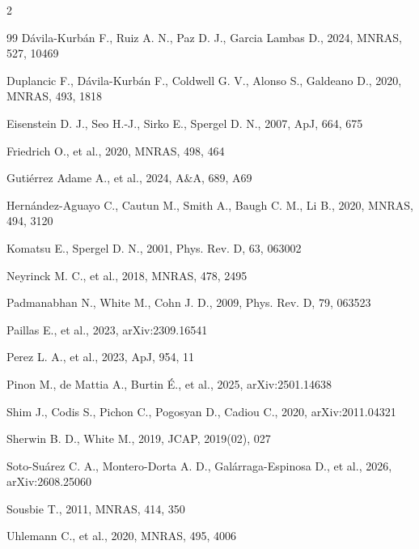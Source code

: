 \documentclass[11pt,a4paper]{article}
\begin{document}
\begin{multicols}{2}
\begin{thebibliography}{99}
D\'avila-Kurb\'an F., Ruiz A. N., Paz D. J., Garcia Lambas D., 2024, MNRAS, 527, 10469

Duplancic F., D\'avila-Kurb\'an F., Coldwell G. V., Alonso S., Galdeano D., 2020, MNRAS, 493, 1818

Eisenstein D. J., Seo H.-J., Sirko E., Spergel D. N., 2007, ApJ, 664, 675

Friedrich O., et al., 2020, MNRAS, 498, 464

Guti\'errez Adame A., et al., 2024, A\&A, 689, A69

Hern\'andez-Aguayo C., Cautun M., Smith A., Baugh C. M., Li B., 2020, MNRAS, 494, 3120

Komatsu E., Spergel D. N., 2001, Phys. Rev. D, 63, 063002

Neyrinck M. C., et al., 2018, MNRAS, 478, 2495

Padmanabhan N., White M., Cohn J. D., 2009, Phys. Rev. D, 79, 063523

Paillas E., et al., 2023, arXiv:2309.16541

Perez L. A., et al., 2023, ApJ, 954, 11

Pinon M., de Mattia A., Burtin \'E., et al., 2025, arXiv:2501.14638

Shim J., Codis S., Pichon C., Pogosyan D., Cadiou C., 2020, arXiv:2011.04321

Sherwin B. D., White M., 2019, JCAP, 2019(02), 027

Soto-Su\'arez C. A., Montero-Dorta A. D., Gal\'arraga-Espinosa D., et al., 2026, arXiv:2608.25060

Sousbie T., 2011, MNRAS, 414, 350

Uhlemann C., et al., 2020, MNRAS, 495, 4006


\end{thebibliography}
\end{multicols}
\end{document}
